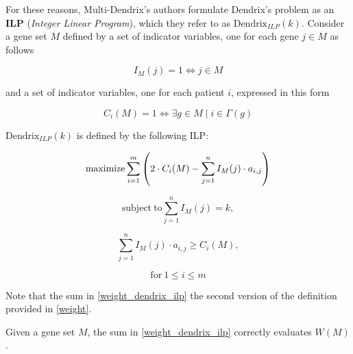 For these reasons, Multi-Dendrix's authors formulate Dendrix's problem as an \textbf{ILP} (\textit{Integer Linear Program}), which they refer to as $\mathrm{Dendrix}_{\mathrm{\textit{ILP}}}(k)$. Consider a gene set $M$ defined by a set of indicator variables, one for each gene $j \in M$ as follows

\begin{equation}
    I_M(j) = 1 \iff j \in M
\end{equation}

and a set of indicator variables, one for each patient $i$, expressed in this form

\begin{equation} \label{c_idefn}
    C_i(M) = 1 \iff \exists g \in M \mid i \in \Gamma(g)
\end{equation}

\begin{definition}
    $\mathrm{Dendrix}_{\mathrm{\textit{ILP}}}(k)$ is defined by the following ILP:

    \begin{equation} \label{weight_dendrix_ilp}
        \mathrm{maximize} \sum_{i = 1}^m {\left(2 \cdot C_i(M) - \sum_{j = 1}^n I_M(j) \cdot a_{i, j}\right)}
    \end{equation}

    \begin{equation} \label{second_constr_dendrix_ilp}
        \mathrm{subject \ to} \sum_{j = 1}^n{I_M(j) = k},
    \end{equation}

    \begin{equation} \label{third_constr_dendrix_ilp}
        \sum_{j = 1}^n I_M(j) \cdot {a_{i, j}} \ge C_i(M),
    \end{equation}

    \begin{equation*}
        \mathrm{for\ } 1 \le i \le m
    \end{equation*}
\end{definition}

Note that the sum in \cref{weight_dendrix_ilp} the second version of the definition provided in \cref{weight}.

\begin{lemma} Given a gene set $M$, the sum in \cref{weight_dendrix_ilp} correctly evaluates $W(M)$.
\end{lemma}

